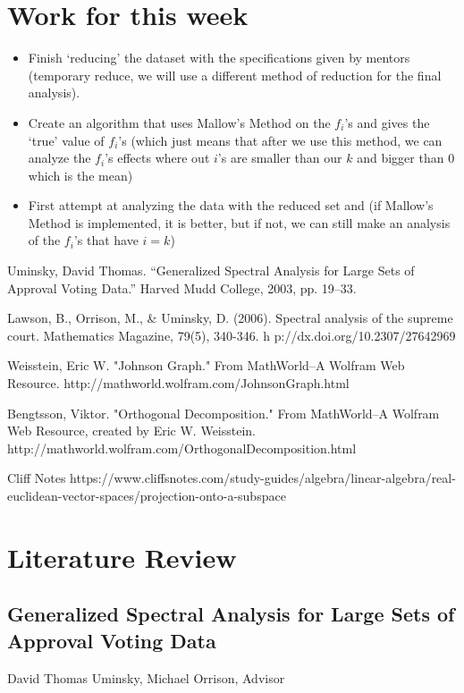 \documentclass{article}
\theoremstyle{remark}
\theoremstyle{definition}
\begin{document}
\section{Work for this week}
    \begin{itemize}
        \item Finish `reducing' the dataset with the specifications given by mentors (temporary reduce, we will use a different method of reduction for the final analysis).
        \item Create an algorithm that uses Mallow's Method on the $f_i$'s and gives the `true' value of $f_i$'s (which just means that after we use this method, we can analyze the $f_i$'s effects where out $i$'s are smaller than our $k$ and bigger than $0$ which is the mean)
        \item First attempt at analyzing the data with the reduced set and (if Mallow's Method is implemented, it is better, but if not, we can still make an analysis of the $f_i$'s that have $i=k$)
    \end{itemize}

\begin{thebibliography}{}
     Uminsky, David Thomas. “Generalized Spectral Analysis for Large Sets of Approval Voting Data.” Harved Mudd College, 2003, pp. 19–33.

     Lawson, B., Orrison, M., & Uminsky, D. (2006). Spectral analysis of the supreme court. Mathematics Magazine, 79(5), 340-346. h p://dx.doi.org/10.2307/27642969
    
     Weisstein, Eric W. "Johnson Graph." From MathWorld--A Wolfram Web Resource. http://mathworld.wolfram.com/JohnsonGraph.html
    
     Bengtsson, Viktor. "Orthogonal Decomposition." From MathWorld--A Wolfram Web Resource, created by Eric W. Weisstein. http://mathworld.wolfram.com/OrthogonalDecomposition.html
    
     Cliff Notes https://www.cliffsnotes.com/study-guides/algebra/linear-algebra/real-euclidean-vector-spaces/projection-onto-a-subspace
\end{thebibliography}

\section{Literature Review}
\subsection{Generalized Spectral Analysis for Large Sets of Approval Voting Data}
David Thomas Uminsky, Michael Orrison, Advisor
\end{document}
